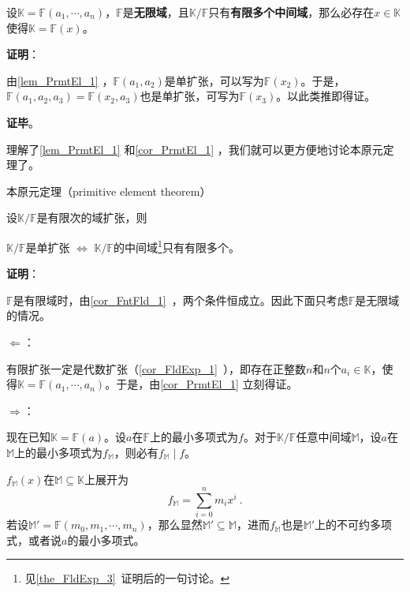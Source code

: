 \begin{corollary}{}\label{cor_PrmtEl_1}
设$\mathbb{K}=\mathbb{F}(a_1, \cdots, a_n)$，$\mathbb{F}$是\textbf{无限域}，且$\mathbb{K}/\mathbb{F}$只有\textbf{有限多个中间域}，那么必存在$x\in\mathbb{K}$使得$\mathbb{K}=\mathbb{F}(x)$。
\end{corollary}

\textbf{证明}：

由\autoref{lem_PrmtEl_1} ，$\mathbb{F}(a_1, a_2)$是单扩张，可以写为$\mathbb{F}(x_2)$。于是，$\mathbb{F}(a_1, a_2, a_3)=\mathbb{F}(x_2, a_3)$也是单扩张，可写为$\mathbb{F}(x_3)$。以此类推即得证。

\textbf{证毕}。


理解了\autoref{lem_PrmtEl_1} 和\autoref{cor_PrmtEl_1} ，我们就可以更方便地讨论本原元定理了。


\begin{theorem}{本原元定理（primitive element theorem）}\label{the_PrmtEl_1}

设$\mathbb{K}/\mathbb{F}$是有限次的域扩张，则

$\mathbb{K}/\mathbb{F}$是单扩张 $\iff$ $\mathbb{K}/\mathbb{F}$的中间域\footnote{见\autoref{the_FldExp_3}~证明后的一句讨论。}只有有限多个。

\end{theorem}

\textbf{证明}：

$\mathbb{F}$是有限域时，由\autoref{cor_FntFld_1}~，两个条件恒成立。因此下面只考虑$\mathbb{F}$是无限域的情况。

$\Leftarrow$：

有限扩张一定是代数扩张（\autoref{cor_FldExp_1}~），即存在正整数$n$和$n$个$a_i\in\mathbb{K}$，使得$\mathbb{K}=\mathbb{F}(a_1, \cdots, a_n)$。于是，由\autoref{cor_PrmtEl_1} 立刻得证。

$\Rightarrow$：

现在已知$\mathbb{K}=\mathbb{F}(a)$。设$a$在$\mathbb{F}$上的最小多项式为$f$。对于$\mathbb{K}/\mathbb{F}$任意中间域$\mathbb{M}$，设$a$在$\mathbb{M}$上的最小多项式为$f_\mathbb{M}$，则必有$f_{\mathbb{M}}\mid f$。

$f_\mathbb{M}(x)$在$\mathbb{M}\subseteq\mathbb{K}$上展开为
\begin{equation}
f_\mathbb{M} = \sum_{i=0}^n m_ix^i~.
\end{equation}
若设$\mathbb{M}'=\mathbb{F}(m_0, m_1, \cdots, m_n)$，那么显然$\mathbb{M}'\subseteq\mathbb{M}$，进而$f_\mathbb{M}$也是$\mathbb{M}'$上的不可约多项式，或者说$a$的最小多项式。


